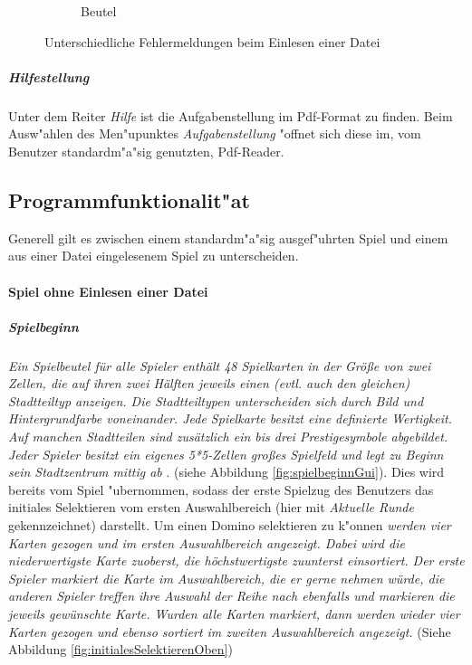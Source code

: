 \begin{figure}
\begin{subfigure}[b]{0.35\textwidth}
            \caption[]%
            {{\small Beutel}}    
            \label{fig:BeutelErr}
        \end{subfigure}
        \caption
        {\small Unterschiedliche Fehlermeldungen beim Einlesen einer Datei} 
        \label{fig:Fehleruebersicht}
    \end{figure}

\subparagraph{Hilfestellung}
Unter dem Reiter \glqq \emph{Hilfe}\grqq {} ist die Aufgabenstellung im Pdf-Format zu finden. Beim Ausw"ahlen des Men"upunktes \emph{Aufgabenstellung} "offnet sich diese im, vom Benutzer standardm"a"sig genutzten, Pdf-Reader. 


\subsection{Programmfunktionalit"at}
Generell gilt es zwischen einem standardm"a"sig ausgef"uhrten Spiel und einem aus einer Datei eingelesenem Spiel zu unterscheiden. 

\paragraph{Spiel ohne Einlesen einer Datei}
\subparagraph{Spielbeginn}
\emph{Ein Spielbeutel für alle Spieler enthält 48 Spielkarten in der Größe von zwei Zellen, die auf ihren zwei Hälften jeweils einen (evtl. auch den gleichen) Stadtteiltyp anzeigen. Die Stadtteiltypen unterscheiden sich durch Bild und Hintergrundfarbe voneinander. Jede Spielkarte besitzt eine definierte Wertigkeit. Auf manchen Stadtteilen sind zusätzlich ein bis drei Prestigesymbole abgebildet. Jeder Spieler besitzt ein eigenes 5*5-Zellen großes Spielfeld und legt zu Beginn sein Stadtzentrum mittig ab}
\cite{aufgabenstellung}. 
(siehe Abbildung \ref{fig:spielbeginnGui}). Dies wird bereits vom Spiel "ubernommen, sodass der erste Spielzug des Benutzers das initiales Selektieren vom ersten Auswahlbereich (hier mit \emph{Aktuelle Runde} gekennzeichnet) darstellt. Um einen Domino selektieren zu k"onnen \emph{werden vier Karten gezogen und im ersten Auswahlbereich angezeigt. Dabei wird die niederwertigste Karte zuoberst, die höchstwertigste zuunterst einsortiert. Der erste Spieler markiert die Karte im Auswahlbereich, die er gerne nehmen würde, die anderen Spieler treffen ihre Auswahl der Reihe nach ebenfalls und markieren die jeweils gewünschte Karte. Wurden alle Karten markiert, dann werden wieder vier Karten gezogen und ebenso sortiert im zweiten Auswahlbereich angezeigt.} 
\cite{aufgabenstellung}
(Siehe Abbildung \ref{fig:initialesSelektierenOben})

